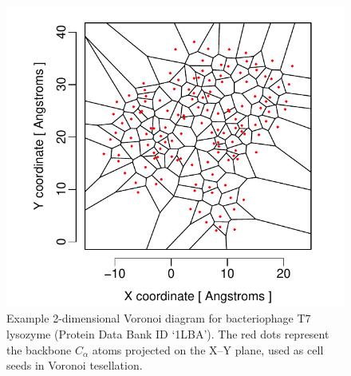 \documentclass[11pt]{article}
\begin{document}
    \begin{figure}[tbh]
        \begin{center}
        \includegraphics[width=6.9in]{voronoi_diagram.pdf}
        \end{center}
        \caption{Example 2-dimensional Voronoi diagram for bacteriophage T7 lysozyme (Protein Data Bank ID `1LBA'). The red dots represent the backbone $C_\alpha$ atoms projected on the X--Y plane, used as cell seeds in Voronoi tesellation.}
        \label{fig:voronoi}
    \end{figure}
\end{document}
